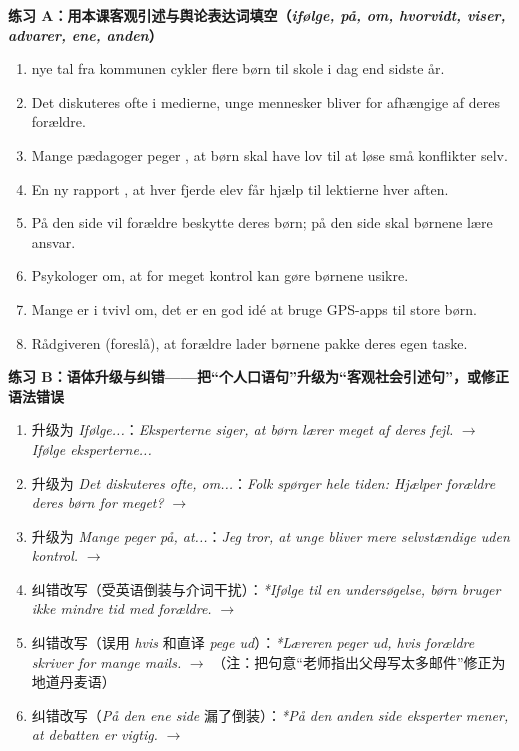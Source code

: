 \textbf{练习 A：用本课客观引述与舆论表达词填空（\textit{ifølge, på, om, hvorvidt, viser, advarer, ene, anden}）}
\begin{enumerate}
  \item \underline{\hspace{1.6cm}} nye tal fra kommunen cykler flere børn til skole i dag end sidste år.
  \item Det diskuteres ofte i medierne, \underline{\hspace{1.8cm}} unge mennesker bliver for afhængige af deres forældre.
  \item Mange pædagoger peger \underline{\hspace{1.2cm}}, at børn skal have lov til at løse små konflikter selv.
  \item En ny rapport \underline{\hspace{1.6cm}}, at hver fjerde elev får hjælp til lektierne hver aften.
  \item På den \underline{\hspace{1.2cm}} side vil forældre beskytte deres børn; på den \underline{\hspace{1.4cm}} side skal børnene lære ansvar.
  \item Psykologer \underline{\hspace{1.8cm}} om, at for meget kontrol kan gøre børnene usikre.
  \item Mange er i tvivl om, \underline{\hspace{1.8cm}} det er en god idé at bruge GPS-apps til store børn.
  \item Rådgiveren \underline{\hspace{1.8cm}} (foreslå), at forældre lader børnene pakke deres egen taske.
\end{enumerate}

\textbf{练习 B：语体升级与纠错——把“个人口语句”升级为“客观社会引述句”，或修正语法错误}
\begin{enumerate}
  \item 升级为 \textit{Ifølge...}：\textit{Eksperterne siger, at børn lærer meget af deres fejl.} $\rightarrow$ \textit{Ifølge eksperterne...}
  \item 升级为 \textit{Det diskuteres ofte, om...}：\textit{Folk spørger hele tiden: Hjælper forældre deres børn for meget?} $\rightarrow$
  \item 升级为 \textit{Mange peger på, at...}：\textit{Jeg tror, at unge bliver mere selvstændige uden kontrol.} $\rightarrow$
  \item 纠错改写（受英语倒装与介词干扰）：\textit{*Ifølge til en undersøgelse, børn bruger ikke mindre tid med forældre.} $\rightarrow$
  \item 纠错改写（误用 \textit{hvis} 和直译 \textit{pege ud}）：\textit{*Læreren peger ud, hvis forældre skriver for mange mails.} $\rightarrow$ （注：把句意“老师指出父母写太多邮件”修正为地道丹麦语）
  \item 纠错改写（\textit{På den ene side} 漏了倒装）：\textit{*På den anden side eksperter mener, at debatten er vigtig.} $\rightarrow$
\end{enumerate}

